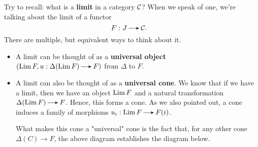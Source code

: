     Try to recall: what is a \textbf{limit} in a category $\mathcal{C}$?
    When we speak of one, we're talking about the limit of a functor 
    \[
        F: J \to \cc.        
    \]
    There are multiple, but 
    equivalent ways to think about it. 
    \begin{itemize}
        \item A limit can be thought of as a \textbf{universal object} 
        $(\Lim F, u: \Delta(\Lim F) \to F)$ from $\Delta$ to $F$. 
        \begin{center}
            \hspace{1cm}
        \end{center}
        
        \item A limit can also be thought of as a \textbf{universal
        cone}. We know that if we have a limit, then we have an 
        object $\operatorname*{\mathrm{Lim }} F$ and
        a natural transformation $\Delta(\Lim F) \to F$. Hence, this
        forms a cone. As we also pointed out, a cone induces a family 
        of morphisms $u_i: \Lim F \to F(i)$. 

        What makes this cone a "universal" cone is the fact that, 
        for any other cone $\Delta(C) \to F$, the above diagram establishes
        the diagram below. 
        \begin{center}
        \end{center}


\end{itemize}
